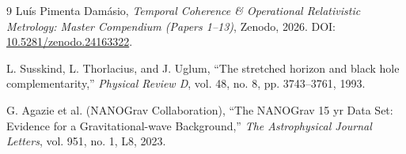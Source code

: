 \documentclass[11pt,a4paper]{article}
\begin{document}
\begin{thebibliography}{9}
Luís {Pimenta Damásio},
\textit{Temporal Coherence \& Operational Relativistic Metrology: Master Compendium (Papers 1--13)},
Zenodo, 2026. DOI: \href{https://doi.org/10.5281/zenodo.24163322}{10.5281/zenodo.24163322}.

L. Susskind, L. Thorlacius, and J. Uglum,
``The stretched horizon and black hole complementarity,''
\textit{Physical Review D}, vol. 48, no. 8, pp. 3743--3761, 1993.

G. Agazie et al. (NANOGrav Collaboration),
``The NANOGrav 15 yr Data Set: Evidence for a Gravitational-wave Background,''
\textit{The Astrophysical Journal Letters}, vol. 951, no. 1, L8, 2023.
\end{thebibliography}
\end{document}
